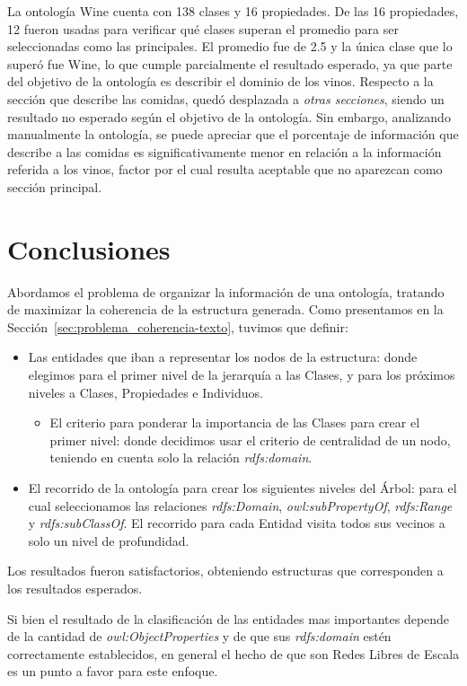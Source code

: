 La ontología Wine cuenta con 138 clases y 16 propiedades. De las 16 propiedades, 12 fueron usadas para verificar qué clases superan el promedio para ser seleccionadas como las principales. El promedio fue de 2.5 y la única clase que lo superó fue Wine, lo que cumple parcialmente el resultado esperado, ya que parte del objetivo de la ontología es describir el dominio de los vinos. Respecto a la sección que describe las comidas, quedó desplazada a \emph{otras secciones}, siendo un resultado no esperado según el objetivo de la ontología. Sin embargo, analizando manualmente la ontología, se puede apreciar que el porcentaje de  información que describe a las comidas es significativamente menor en relación a la información referida a los vinos, factor por el cual resulta aceptable que no aparezcan como sección principal.


\section{Conclusiones}
Abordamos el problema de organizar la información de una ontología, tratando de maximizar la coherencia de la estructura generada. Como presentamos en la Sección~\ref{sec:problema_coherencia-texto}, tuvimos que definir:
\begin{itemize}
    \item Las entidades que iban a representar los nodos de la estructura: donde elegimos para el primer nivel de la jerarquía a las Clases, y para los próximos niveles a Clases, Propiedades e Individuos.
    \begin{itemize}
        \item El criterio para ponderar la importancia de las Clases para crear el primer nivel: donde decidimos usar el criterio de centralidad de un nodo, teniendo en cuenta solo la relación \emph{rdfs:domain}.
    \end{itemize}
    \item El recorrido de la ontología para crear los siguientes niveles del Árbol: para el cual seleccionamos las relaciones \emph{rdfs:Domain}, \emph{owl:subPropertyOf}, \emph{rdfs:Range} y \emph{rdfs:subClassOf}. El recorrido para cada Entidad visita todos sus vecinos a solo un nivel de profundidad.
\end{itemize}

Los resultados fueron satisfactorios, obteniendo estructuras que corresponden a los resultados esperados. 

Si bien el resultado de la clasificación de las entidades mas importantes depende de la cantidad de \emph{owl:ObjectProperties} y de que sus \emph{rdfs:domain} estén correctamente establecidos, en general el hecho de que son Redes Libres de Escala es un punto a favor para este enfoque.